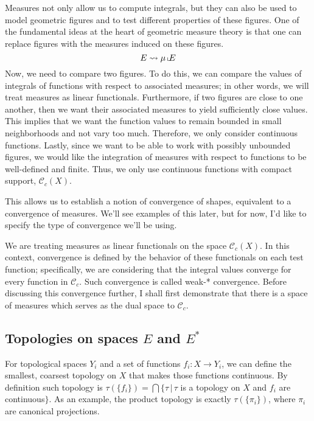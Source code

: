 Measures not only allow us to compute integrals, but they can also be used to
model geometric figures and to test different properties of these figures. One
of the fundamental ideas at the heart of geometric measure theory is that one
can replace figures with the measures induced on these figures.
\[E\rightsquigarrow \mu\,\llcorner\hspace{-1mm}E\]
Now, we need to compare two figures. To do this, we can compare the values of
integrals of functions with respect to associated measures; in other words, we will
treat measures as linear functionals. Furthermore, if two figures are close to
one another, then we want their associated measures to yield sufficiently close
values. This implies that we want the function values to remain bounded in small
neighborhoods and not vary too much. Therefore, we only consider continuous
functions. Lastly, since we want to be able to work with possibly unbounded
figures, we would like the integration of measures with respect to functions to
be well-defined and finite. Thus, we only use continuous functions with compact
support, $\mathcal C_c(X)$.

\vspace{1ex}
This allows us to establish a notion of convergence of shapes, equivalent to a
convergence of measures. We'll see examples of this later, but for now, I'd
like to specify the type of convergence we'll be using.

We are treating measures as linear functionals on the space $\mathcal C_c(X)$.
In this context, convergence is defined by the behavior of these functionals on
each test function; specifically, we are considering that the integral values
converge for every function in $\mathcal C_c$. Such convergence is called 
weak-* convergence. Before discussing this convergence further, I shall first
demonstrate that there is a space of measures which serves as the dual space to
$\mathcal C_c$.

\subsection{Topologies on spaces $E$ and $E^*$}
For topological spaces $Y_i$ and a set of functions $f_i:X\rightarrow Y_i$, we can
define the smallest, coarsest topology on $X$ that makes those functions continuous.
By definition such topology is $\tau(\{f_i\})=\bigcap\{\tau\,|\,
\tau$ is a topology on $X$ and $f_i$ are continuous$\}$. As an
example, the product topology is exactly $\tau(\{\pi_i\})$, where $\pi_i$ are
canonical projections.
\vspace{1ex}


